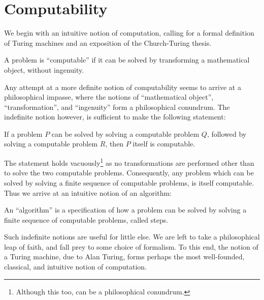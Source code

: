 \chapter{Computability}


We begin with an intuitive notion of computation, calling for a formal
definition of Turing machines and an exposition of the Church-Turing thesis.

\begin{notion} A problem is ``computable'' if it can be solved by transforming
a mathematical object, without ingenuity.
\end{notion}

Any attempt at a more definite notion of computability seems to arrive at a
philosophical impasse, where the notions of ``mathematical object'',
``transformation'', and ``ingenuity'' form a philosophical conundrum. The
indefinite notion however, is sufficient to make the following statement:

\begin{statement} If a problem $P$ can be solved by solving a computable
problem $Q$, followed by solving a computable problem $R$, then $P$ itself is
computable. \end{statement}

The statement holds vacuously\footnote{Although this too, can be a
philosophical conundrum.} as no transformations are performed other than to
solve the two computable problems. Consequently, any problem which can be
solved by solving a finite sequence of computable problems, is itself
computable. Thus we arrive at an intuitive notion of an algorithm:

\begin{notion} An ``algorithm'' is a specification of how a problem can be
solved by solving a finite sequence of computable problems, called
steps.\end{notion}

Such indefinite notions are useful for little else. We are left to take a
philosophical leap of faith, and fall prey to some choice of formalism. To this
end, the notion of a Turing machine, due to Alan Turing\cite{turing-1937},
forms perhaps the most well-founded, classical, and intuitive notion of
computation.


